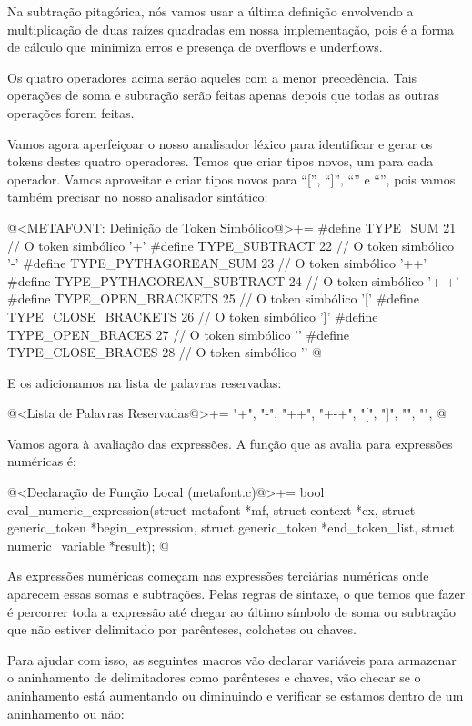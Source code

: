 Na subtração pitagórica, nós vamos usar a última definição envolvendo
a multiplicação de duas raízes quadradas em nossa implementação, pois
é a forma de cálculo que minimiza erros e presença de overflows e
underflows.

Os quatro operadores acima serão aqueles com a menor precedência. Tais
operações de soma e subtração serão feitas apenas depois que todas as
outras operações forem feitas.

Vamos agora aperfeiçoar o nosso analisador léxico para identificar e
gerar os tokens destes quatro operadores. Temos que criar tipos novos,
um para cada operador. Vamos aproveitar e criar tipos novos para
``['', ``]'', ``{'' e ``}'', pois vamos também precisar no nosso
analisador sintático:

\iniciocodigo
@<METAFONT: Definição de Token Simbólico@>+=
#define TYPE_SUM                   21 // O token simbólico '+'
#define TYPE_SUBTRACT              22 // O token simbólico '-'
#define TYPE_PYTHAGOREAN_SUM       23 // O token simbólico '++'
#define TYPE_PYTHAGOREAN_SUBTRACT  24 // O token simbólico '+-+'
#define TYPE_OPEN_BRACKETS         25 // O token simbólico '['
#define TYPE_CLOSE_BRACKETS        26 // O token simbólico ']'
#define TYPE_OPEN_BRACES           27 // O token simbólico '{'
#define TYPE_CLOSE_BRACES          28 // O token simbólico '}'
@
\fimcodigo

E os adicionamos na lista de palavras reservadas:

\iniciocodigo
@<Lista de Palavras Reservadas@>+=
"+", "-", "++", "+-+", "[", "]", "{", "}",
@
\fimcodigo


Vamos agora à avaliação das expressões. A função que as avalia para
expressões numéricas é:

\iniciocodigo
@<Declaração de Função Local (metafont.c)@>+=
bool eval_numeric_expression(struct metafont *mf, struct context *cx,
                             struct generic_token *begin_expression,
                             struct generic_token *end_token_list,
                             struct numeric_variable *result);
@
\fimcodigo


As expressões numéricas começam nas expressões terciárias numéricas
onde aparecem essas somas e subtrações. Pelas regras de sintaxe, o que
temos que fazer é percorrer toda a expressão até chegar ao último
símbolo de soma ou subtração que não estiver delimitado por
parênteses, colchetes ou chaves.

Para ajudar com isso, as seguintes macros vão declarar variáveis para
armazenar o aninhamento de delimitadores como parênteses e chaves, vão
checar se o aninhamento está aumentando ou diminuindo e verificar se
estamos dentro de um aninhamento ou não:

